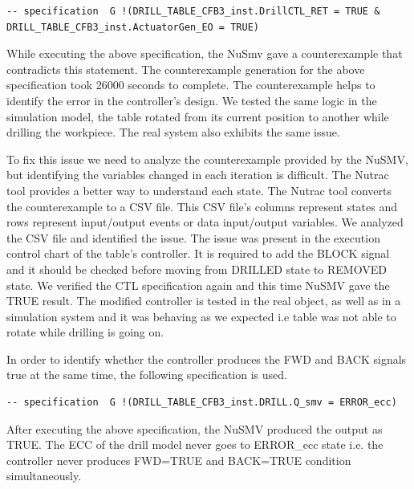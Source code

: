 \documentclass[conference]{IEEEtran}
\begin{document}
\begin{lstlisting}[breaklines,basicstyle=\small]
-- specification  G !(DRILL_TABLE_CFB3_inst.DrillCTL_RET = TRUE & DRILL_TABLE_CFB3_inst.ActuatorGen_EO = TRUE)  
\end{lstlisting}

While executing the above specification, the NuSmv gave a counterexample that contradicts this statement. The counterexample generation for the above specification took 26000 seconds to complete. The counterexample helps to identify the error in the controller's design. We tested the same logic in the simulation model, the table rotated from its current position to another while drilling the workpiece. The real system also exhibits the same issue.

To fix this issue we need to analyze the counterexample provided by the NuSMV, but identifying the variables changed in each iteration is difficult. The Nutrac tool provides a better way to understand each state. The Nutrac tool converts the counterexample to a CSV file. This CSV file's columns represent states and rows represent input/output events or data input/output variables. We analyzed the CSV file and identified the issue. The issue was present in the execution control chart of the table's controller. It is required to add the BLOCK signal and it should be checked before moving from DRILLED state to REMOVED state. We verified the CTL specification again and this time NuSMV gave the TRUE result. The modified controller is tested in the real object, as well as in a simulation system and it was behaving as we expected i.e table was not able to rotate while drilling is going on.

In order to identify whether the  controller produces the {FWD} and {BACK} signals true at the same time, the following specification is used.

\begin{lstlisting}[breaklines,basicstyle=\small]
-- specification  G !(DRILL_TABLE_CFB3_inst.DRILL.Q_smv = ERROR_ecc)
\end{lstlisting}
 

After executing the above specification, the NuSMV produced the output as  TRUE.  The ECC of the drill model never goes to ERROR\_ecc state i.e. the controller never produces {FWD=TRUE} and {BACK=TRUE} condition simultaneously.  
\end{document}
